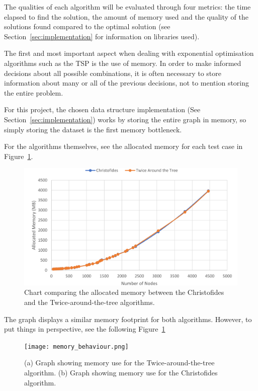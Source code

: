 \documentclass[12pt]{article}
\begin{document}
The qualities of each algorithm will be evaluated through four metrics: the time elapsed 
to find the solution, the amount of memory used and the quality of the solutions found 
compared to the optimal solution (see Section~\ref{sec:implementation} for information 
on libraries used).

 \label{sec:exp_memory}

The first and most important aspect when dealing with exponential optimisation algorithms such as 
the TSP is the use of memory. In order to make informed decisions about all possible combinations, 
it is often necessary to store information about many or all of the previous decisions, not to 
mention storing the entire problem.

For this project, the chosen data structure implementation (See Section~\ref{sec:implementation}) works by storing 
the entire graph in memory, so simply storing the dataset is the first memory bottleneck.

For the algorithms themselves, see the allocated memory for each test case in Figure~\ref{fig:mem_use}.

\begin{figure}[ht]
\centering
\includegraphics[height=.325\textheight]{memory_use_comparison.png}
\caption{Chart comparing the allocated memory between the Christofides and the Twice-around-the-tree algorithms.}
\label{fig:mem_use}
\end{figure}

The graph displays a similar memory footprint for both algorithms. However, to put things in perspective, 
see the following Figure~\ref{fig:mem_use} 

\begin{figure}[ht]
\centering
\texttt{[image: memory\_behaviour.png]}
\caption{(a) Graph showing memory use for the Twice-around-the-tree algorithm. (b) Graph showing memory use for the Christofides algorithm.}
\label{fig:memory_behaviour}
\end{figure}
\end{document}
